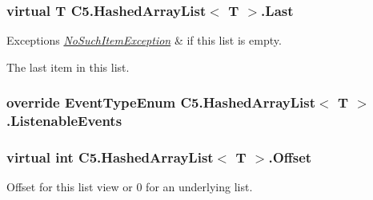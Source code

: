 \subsubsection[{Last}]{\setlength{\rightskip}{0pt plus 5cm}virtual T {\bf C5.\+Hashed\+Array\+List}$<$ T $>$.Last\hspace{0.3cm}{\ttfamily [get]}}\label{class_c5_1_1_hashed_array_list_aaa8c79aed9aec799ea687392fc39a028}





\begin{DoxyExceptions}{Exceptions}
{\em \hyperlink{class_c5_1_1_no_such_item_exception}{No\+Such\+Item\+Exception}} & if this list is empty.\\
\hline
\end{DoxyExceptions}


The last item in this list.\hypertarget{class_c5_1_1_hashed_array_list_accdd1813a4a5bdff31d1e19d9867c868}{}
\subsubsection[{Listenable\+Events}]{\setlength{\rightskip}{0pt plus 5cm}override {\bf Event\+Type\+Enum} {\bf C5.\+Hashed\+Array\+List}$<$ T $>$.Listenable\+Events\hspace{0.3cm}{\ttfamily [get]}}\label{class_c5_1_1_hashed_array_list_accdd1813a4a5bdff31d1e19d9867c868}




\hypertarget{class_c5_1_1_hashed_array_list_a1fb3ecd68335ab401853035b171b9510}{}
\subsubsection[{Offset}]{\setlength{\rightskip}{0pt plus 5cm}virtual int {\bf C5.\+Hashed\+Array\+List}$<$ T $>$.Offset\hspace{0.3cm}{\ttfamily [get]}}\label{class_c5_1_1_hashed_array_list_a1fb3ecd68335ab401853035b171b9510}




Offset for this list view or 0 for an underlying list.\hypertarget{class_c5_1_1_hashed_array_list_a7122ca8cf35c8a9ec72facf36d2fb360}{}
